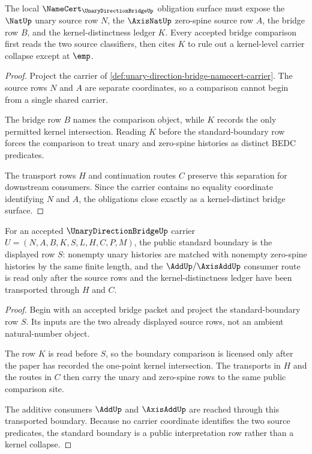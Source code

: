 \begin{theorem}
\label{thm:unary-direction-bridge-kernel-distinct-obligations}
The local $\NameCert_{\UnaryDirectionBridgeUp}$ obligation surface must expose the $\NatUp$ unary source row $N$, the $\AxisNatUp$ zero-spine source row $A$, the bridge row $B$, and the kernel-distinctness ledger $K$. Every accepted bridge comparison first reads the two source classifiers, then cites $K$ to rule out a kernel-level carrier collapse except at $\emp$.
\end{theorem}
\begin{proof}
Project the carrier of \autoref{def:unary-direction-bridge-namecert-carrier}. The source rows $N$ and $A$ are separate coordinates, so a comparison cannot begin from a single shared carrier.

The bridge row $B$ names the comparison object, while $K$ records the only permitted kernel intersection. Reading $K$ before the standard-boundary row forces the comparison to treat unary and zero-spine histories as distinct BEDC predicates.

The transport rows $H$ and continuation routes $C$ preserve this separation for downstream consumers. Since the carrier contains no equality coordinate identifying $N$ and $A$, the obligations close exactly as a kernel-distinct bridge surface.
\end{proof}

\begin{theorem}
\label{thm:unary-direction-bridge-standard-boundary}
For an accepted $\UnaryDirectionBridgeUp$ carrier $U=(N,A,B,K,S,L,H,C,P,M)$, the public standard boundary is the displayed row $S$: nonempty unary histories are matched with nonempty zero-spine histories by the same finite length, and the $\AddUp/\AxisAddUp$ consumer route is read only after the source rows and the kernel-distinctness ledger have been transported through $H$ and $C$.
\end{theorem}
\begin{proof}
Begin with an accepted bridge packet and project the standard-boundary row $S$. Its inputs are the two already displayed source rows, not an ambient natural-number object.

The row $K$ is read before $S$, so the boundary comparison is licensed only after the paper has recorded the one-point kernel intersection. The transports in $H$ and the routes in $C$ then carry the unary and zero-spine rows to the same public comparison site.

The additive consumers $\AddUp$ and $\AxisAddUp$ are reached through this transported boundary. Because no carrier coordinate identifies the two source predicates, the standard boundary is a public interpretation row rather than a kernel collapse.
\end{proof}

